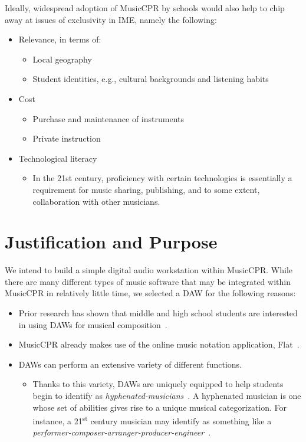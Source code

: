 \documentclass[manuscript,screen,review]{acmart}
\begin{document}
Ideally, widespread adoption of MusicCPR by schools would also help to chip away at issues of exclusivity in IME, namely the following:
\begin{itemize}
    \item Relevance, in terms of:
    \begin{itemize}
        \item Local geography
        \item Student identities, e.g., cultural backgrounds and listening habits
    \end{itemize}
    \item Cost
    \begin{itemize}
        \item Purchase and maintenance of instruments
        \item Private instruction 
    \end{itemize}
    \item Technological literacy
    \begin{itemize}
        \item In the 21st century, proficiency with certain technologies is essentially a requirement for music sharing, publishing, and to some extent, collaboration with other musicians. 
    \end{itemize}
\end{itemize}

\section{Justification and Purpose}
We intend to build a simple digital audio workstation within MusicCPR.
While there are many different types of music software that may be integrated within MusicCPR in relatively little time, we selected a DAW for the following reasons:

\begin{itemize}
    \item Prior research has shown that middle and high school students are interested in using DAWs for musical composition~\cite{PendergastRobinson}.
    \item MusicCPR already makes use of the online music notation application, Flat~\cite{Flat}.
    \item DAWs can perform an extensive variety of different functions.
    \begin{itemize}
        \item Thanks to this variety, DAWs are uniquely equipped to help students begin to identify as \textit{hyphenated-musicians}~\cite{Tobias}. A hyphenated musician is one whose set of abilities gives rise to a unique musical categorization. For instance, a 21\textsuperscript{st} century musician may identify as something like a \textit{performer-composer-arranger-producer-engineer}~\cite{Pendergast}.
    \end{itemize}
\end{itemize}
\end{document}
